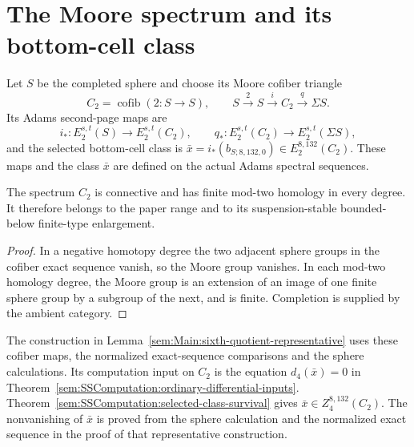 \section{The Moore spectrum and its bottom-cell class}

\begin{definition}
\label{sem:AdamsComputation:moore-object}
\label{sem:AdamsComputation:moore-scope}
Let $S$ be the completed sphere and choose its Moore cofiber triangle
\[
 C_2=\operatorname{cofib}(2:S\to S),\qquad
 S\xrightarrow{2}S\xrightarrow{i}C_2\xrightarrow{q}\Sigma S.
\]
Its Adams second-page maps are
\[
 i_*:E_2^{s,t}(S)\to E_2^{s,t}(C_2),\qquad
 q_*:E_2^{s,t}(C_2)\to E_2^{s,t}(\Sigma S),
\]
and the selected bottom-cell class is
$\bar x=i_*(b_{S;8,132,0})\in E_2^{8,132}(C_2)$.
These maps and the class $\bar x$ are defined on the actual Adams
spectral sequences.

The spectrum $C_2$ is connective and has finite mod-two homology in
every degree. It therefore belongs to the paper range and to its
suspension-stable bounded-below finite-type enlargement.
\end{definition}
\begin{proof}
In a negative homotopy degree the two adjacent sphere groups in the
cofiber exact sequence vanish, so the Moore group vanishes. In each
mod-two homology degree, the Moore group is an extension of an image
of one finite sphere group by a subgroup of the next, and is finite.
Completion is supplied by the ambient category.
\end{proof}

The construction in Lemma~\ref{sem:Main:sixth-quotient-representative}
uses these cofiber maps, the normalized exact-sequence comparisons and
the sphere calculations. Its computation input on $C_2$ is the equation
$d_4(\bar x)=0$ in Theorem~\ref{sem:SSComputation:ordinary-differential-inputs}.
Theorem~\ref{sem:SSComputation:selected-class-survival} gives
$\bar x\in Z_4^{8,132}(C_2)$. The nonvanishing of $\bar x$ is proved
from the sphere calculation and the normalized exact sequence in the
proof of that representative construction.

